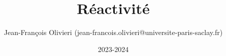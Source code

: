 \documentclass[a4paper]{article}
\title{Réactivité}
\author{Jean-François Olivieri (jean-francois.olivieri@universite-paris-saclay.fr)}
\date{2023-2024}
\theoremstyle{definition}
\begin{document}

\graphicspath{{Allo-CP-Ex01/}}


\newpage

\graphicspath{{Allo-CP-Ex02/}}


\newpage

\graphicspath{{Allo-CP-Ex03/}}


\newpage

\graphicspath{{Allo-CP-Ex04/}}


\newpage

\graphicspath{{Diag-PT-Ex01/}}


\newpage

\graphicspath{{Diag-PT-Ex02/}}


\newpage

\graphicspath{{Gaz-CP-Ex01/}}


\newpage

\graphicspath{{Gaz-CP-Ex02/}}


\newpage

\graphicspath{{Gaz-CP-Ex03/}}


\newpage

\graphicspath{{Poly-CP-Ex01/}}


\newpage

\graphicspath{{Poly-CP-Ex02/}}


\newpage

\graphicspath{{Trans-CP-Ex01/}}


\newpage

\graphicspath{{Trans-CP-Ex02/}}


\newpage

\graphicspath{{Trans-CP-Ex03/}}


\newpage
\end{document}
